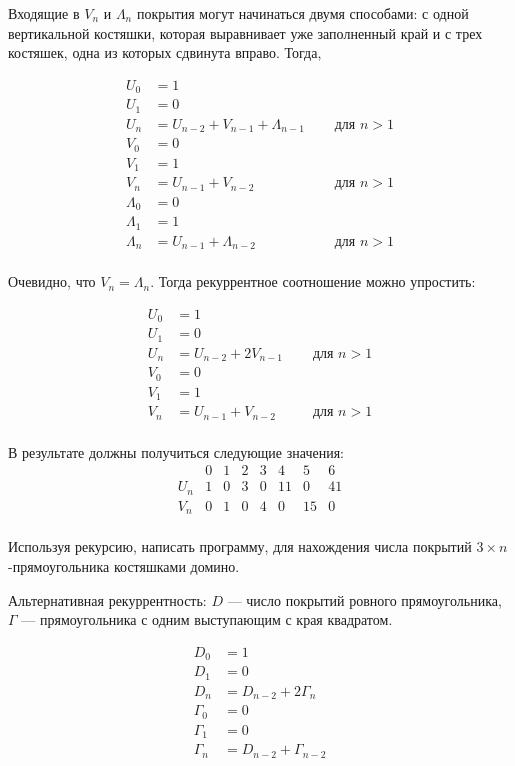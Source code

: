 Входящие в $V_n$ и $\Lambda_n$ покрытия могут начинаться двумя способами: с одной вертикальной
костяшки, которая выравнивает уже заполненный край и с трех костяшек, одна из которых сдвинута вправо.
Тогда,

\begin{align*}
U_0 &= 1 \\
U_1 &= 0 \\
U_n &= U_{n-2} + V_{n-1} + \Lambda_{n-1} \quad & \text{ для $n>1$}\\
V_0 &= 0 \\
V_1 &= 1 \\
V_n &= U_{n-1} + V_{n-2} & \text{ для $n>1$}\\
\Lambda_0 &= 0 \\
\Lambda_1 &= 1 \\
\Lambda_n &= U_{n-1} + \Lambda_{n-2} & \text{ для $n>1$}\\
\end{align*}

Очевидно, что $V_n = \Lambda_n$. Тогда рекуррентное соотношение можно упростить:

\begin{align*}
U_0 &= 1 \\
U_1 &= 0 \\
U_n &= U_{n-2} + 2V_{n-1} \quad & \text{ для $n>1$}\\
V_0 &= 0 \\
V_1 &= 1 \\
V_n &= U_{n-1} + V_{n-2} & \text{ для $n>1$}\\
\end{align*}

В результате должны получиться следующие значения:
$$
 \begin{array}{c|ccccccc}
      & 0 & 1 & 2 & 3 & 4  & 5  & 6  \\
  \hline
  U_n & 1 & 0 & 3 & 0 & 11 & 0  & 41 \\
  V_n & 0 & 1 & 0 & 4 & 0  & 15 & 0  \\
 \end{array}
$$

\begin{task}
Используя рекурсию, написать программу, для нахождения числа покрытий 
$3\times n$-прямоугольника костяшками домино.
\end{task}

Альтернативная рекуррентность: $D$ --- число покрытий ровного прямоугольника,
$\Gamma$ --- прямоугольника с одним выступающим с края квадратом.

\begin{align*}
D_0 &= 1 \\
D_1 &= 0 \\
D_n &= D_{n-2} + 2\Gamma_n \\
\Gamma_0 &= 0 \\
\Gamma_1 &= 0 \\
\Gamma_n &= D_{n-2} + \Gamma_{n-2} \\
\end{align*}

